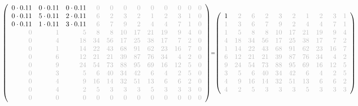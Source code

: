 \documentclass[11pt]{article}
\begin{document}
    \[\scriptstyle \def\g{\color{lightgray}}\left(\begin{array}{rrrrrrrrrrrr}0\cdot 0.11 & 0\cdot 0.11 & 0\cdot 0.11 & \g{0} & \g{0} & \g{0} & \g{0} & \g{0} & \g{0} & \g{0} & \g{0} & \g{0}\\0\cdot 0.11 & 5\cdot 0.11 & 2\cdot 0.11 & \g{6} & \g{2} & \g{3} & \g{2} & \g{1} & \g{2} & \g{3} & \g{1} & \g{0}\\0\cdot 0.11 & 1\cdot 0.11 & 3\cdot 0.11 & \g{6} & \g{7} & \g{9} & \g{2} & \g{4} & \g{4} & \g{7} & \g{1} & \g{0}\\\g{0} & \g{1} & \g{5} & \g{8} & \g{8} & \g{10} & \g{17} & \g{21} & \g{19} & \g{9} & \g{4} & \g{0}\\\g{0} & \g{4} & \g{18} & \g{34} & \g{56} & \g{17} & \g{25} & \g{38} & \g{17} & \g{7} & \g{2} & \g{0}\\\g{0} & \g{1} & \g{14} & \g{22} & \g{43} & \g{68} & \g{91} & \g{62} & \g{23} & \g{16} & \g{7} & \g{0}\\\g{0} & \g{6} & \g{12} & \g{21} & \g{21} & \g{39} & \g{87} & \g{76} & \g{34} & \g{4} & \g{2} & \g{0}\\\g{0} & \g{9} & \g{24} & \g{54} & \g{73} & \g{88} & \g{95} & \g{69} & \g{16} & \g{12} & \g{5} & \g{0}\\\g{0} & \g{3} & \g{5} & \g{6} & \g{40} & \g{34} & \g{42} & \g{6} & \g{4} & \g{2} & \g{5} & \g{0}\\\g{0} & \g{4} & \g{9} & \g{16} & \g{14} & \g{32} & \g{51} & \g{13} & \g{6} & \g{6} & \g{2} & \g{0}\\\g{0} & \g{4} & \g{2} & \g{5} & \g{3} & \g{3} & \g{3} & \g{5} & \g{3} & \g{3} & \g{3} & \g{0}\\\g{0} & \g{0} & \g{0} & \g{0} & \g{0} & \g{0} & \g{0} & \g{0} & \g{0} & \g{0} & \g{0} & \g{0}\end{array}\right)=\left(\begin{array}{rrrrrrrrrrrr}1 & \g{2} & \g{6} & \g{2} & \g{3} & \g{2} & \g{1} & \g{2} & \g{3} & \g{1}\\\g{1} & \g{3} & \g{6} & \g{7} & \g{9} & \g{2} & \g{4} & \g{4} & \g{7} & \g{1}\\\g{1} & \g{5} & \g{8} & \g{8} & \g{10} & \g{17} & \g{21} & \g{19} & \g{9} & \g{4}\\\g{4} & \g{18} & \g{34} & \g{56} & \g{17} & \g{25} & \g{38} & \g{17} & \g{7} & \g{2}\\\g{1} & \g{14} & \g{22} & \g{43} & \g{68} & \g{91} & \g{62} & \g{23} & \g{16} & \g{7}\\\g{6} & \g{12} & \g{21} & \g{21} & \g{39} & \g{87} & \g{76} & \g{34} & \g{4} & \g{2}\\\g{9} & \g{24} & \g{54} & \g{73} & \g{88} & \g{95} & \g{69} & \g{16} & \g{12} & \g{5}\\\g{3} & \g{5} & \g{6} & \g{40} & \g{34} & \g{42} & \g{6} & \g{4} & \g{2} & \g{5}\\\g{4} & \g{9} & \g{16} & \g{14} & \g{32} & \g{51} & \g{13} & \g{6} & \g{6} & \g{2}\\\g{4} & \g{2} & \g{5} & \g{3} & \g{3} & \g{3} & \g{5} & \g{3} & \g{3} & \g{3}\end{array}\right)\]
\end{document}

